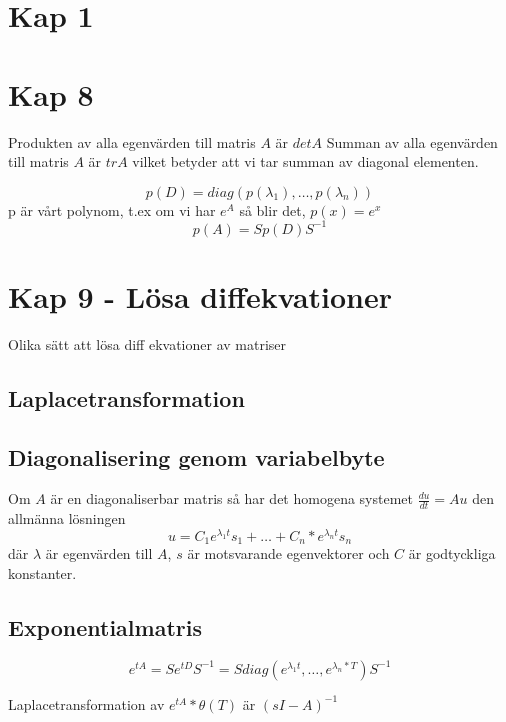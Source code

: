 \documentclass[twocolumn,a4paper]{article}
\begin{document}
\section*{Kap 1}

\section*{Kap 8}
Produkten av alla egenvärden till matris $A$ är $det A$ \newline
Summan av alla egenvärden till matris $A$ är $tr A$ vilket betyder att vi tar summan av diagonal elementen.

\begin{equation}
    p(D) = diag(p(\lambda_1),\ldots,p(\lambda_n))
\end{equation}
p är vårt polynom, t.ex om vi har $e^A$ så blir det, $p(x) = e^x$
\begin{equation}
    p(A) = Sp(D)S^{-1}
\end{equation}
\section*{Kap 9 - Lösa diffekvationer}
Olika sätt att lösa diff ekvationer av matriser
\subsection*{ Laplacetransformation}

\subsection*{Diagonalisering genom variabelbyte}
Om $A$ är en diagonaliserbar matris så har det homogena systemet $\frac{du}{dt} = Au$ den allmänna lösningen
\begin{equation}
    u=C_1e^{\lambda_1t}s_1+\ldots+C_n*e^{\lambda_nt}s_n
\end{equation}
där $\lambda$ är egenvärden till $A$, $s$ är motsvarande egenvektorer och $C$ är godtyckliga konstanter. 
\subsection*{Exponentialmatris}
\begin{equation}
    e^{tA} = Se^{tD}S^{-1} = S diag(e^{\lambda_1t}, \ldots, e^{\lambda_n * T}) S^{-1}
\end{equation}

Laplacetransformation av $e^{t A}* \theta (T)$ är $(sI-A)^{-1}$
\end{document}
